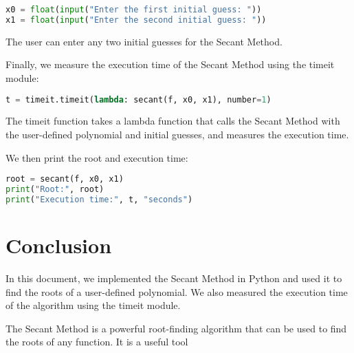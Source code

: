\documentclass{article}
\begin{document}
\begin{lstlisting}[language=Python]
x0 = float(input("Enter the first initial guess: "))
x1 = float(input("Enter the second initial guess: "))
\end{lstlisting}

The user can enter any two initial guesses for the Secant Method.

\newpage

Finally, we measure the execution time of the Secant Method using the timeit module:

\begin{lstlisting}[language=Python]
t = timeit.timeit(lambda: secant(f, x0, x1), number=1)
\end{lstlisting}

The timeit function takes a lambda function that calls the Secant Method with the user-defined polynomial and initial guesses, and measures the execution time.

We then print the root and execution time:

\begin{lstlisting}[language=Python]
root = secant(f, x0, x1)
print("Root:", root)
print("Execution time:", t, "seconds")
\end{lstlisting}

\section{Conclusion}

In this document, we implemented the Secant Method in Python and used it to find the roots of a user-defined polynomial. We also measured the execution time of the algorithm using the timeit module.

The Secant Method is a powerful root-finding algorithm that can be used to find the roots of any function. It is a useful tool
\end{document}
